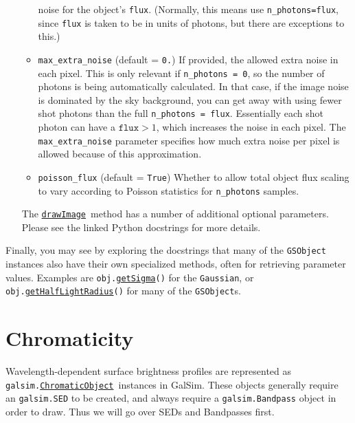 \documentclass[preprint,10pt]{../../devel/modules/aastex}
\newcommand\ChromaticObject{\href{http://galsim-developers.github.io/GalSim/classgalsim_1_1chromatic_1_1_chromatic_object.html}{\texttt{ChromaticObject}}}
\newcommand\drawImage{\href{http://galsim-developers.github.io/GalSim/classgalsim_1_1base_1_1_g_s_object.html\#aafe6ca9d84fe81543fbc105b897273db}{\texttt{drawImage}}}
\begin{document}
\begin{itemize}
\begin{itemize}
      noise for the object's \texttt{flux}.  (Normally, this means use \texttt{n\_photons=flux},
      since \texttt{flux} is taken to be in units of photons, but there are exceptions to this.)
    \item \texttt{max\_extra\_noise} (default = \texttt{0.}) \newline If
      provided, the allowed extra noise in each pixel.  This is only
      relevant if \texttt{n\_photons = 0}, so the number of photons is
      being automatically calculated.  In that case, if the image noise is
      dominated by the sky background, you can get away with using fewer
      shot photons than the full \texttt{n\_photons = flux}.  Essentially
      each shot photon can have a $\texttt{flux} > 1$, which increases the
      noise in each pixel.  The \texttt{max\_extra\_noise} parameter
      specifies how much extra noise per pixel is allowed because of this
      approximation.
    \item \texttt{poisson\_flux} (default = \texttt{True}) \newline
      Whether to allow total object flux scaling to vary according to
      Poisson statistics for \texttt{n\_photons} samples.
  \end{itemize}
  The \drawImage\ method has a number of additional optional
  parameters.  Please see the linked Python docstrings for more
  details.
\end{itemize}

Finally, you may see by exploring the docstrings that many of the \texttt{GSObject}
instances also have their own specialized methods, often for
retrieving parameter values. Examples are
  \texttt{obj.}\href{http://galsim-developers.github.io/GalSim/classgalsim_1_1base_1_1_gaussian.html#a418f2826a7b8934cfedc181de23ce826}{\texttt{getSigma}}\texttt{()}
for the \texttt{Gaussian}, or
  \texttt{obj.}\href{http://galsim-developers.github.io/GalSim/classgalsim_1_1base_1_1_sersic.html#ad6ca39293c6b478fc052d07ea51d086f}{\texttt{getHalfLightRadius}}\texttt{()}
for many of the \texttt{GSObject}s.

\section{Chromaticity}\label{sect:chromaticity}

Wavelength-dependent surface brightness profiles are represented as
\texttt{galsim.}\ChromaticObject\ instances in GalSim.
These objects generally require an \texttt{galsim.SED} to be created,
and always require a \texttt{galsim.Bandpass} object in order to draw.
Thus we will go over SEDs and Bandpasses first.
\end{document}
